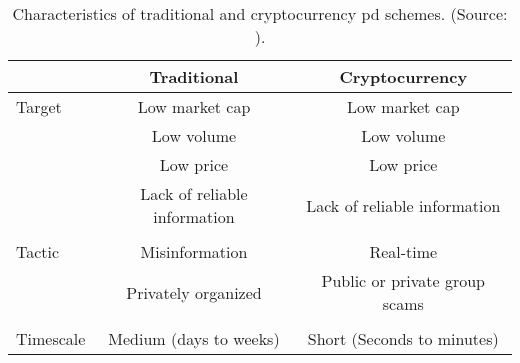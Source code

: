 \begin{table}[ht]
    \centering
    \begin{tabular}{l c c}
    \hline
     &\textbf{Traditional} & \textbf{Cryptocurrency}\\
    \hline
     Target   & Low market cap & Low market cap \\
              & Low volume     & Low volume \\
              & Low price      & Low price \\
              & Lack of reliable information & Lack of reliable information\\
              \\
    Tactic    & Misinformation & Real-time\\
              & Privately organized & Public or private group scams\\
              \\
    Timescale & Medium (days to weeks) & Short (Seconds to minutes)\\
    \hline
    \end{tabular}
    \caption[\acf{pd} characteristics]{Characteristics of traditional and cryptocurrency \ac{pd} schemes. (Source: \cite{P&D_to_the_moon}). }
    \label{tab:pd_characteristics}
\end{table}